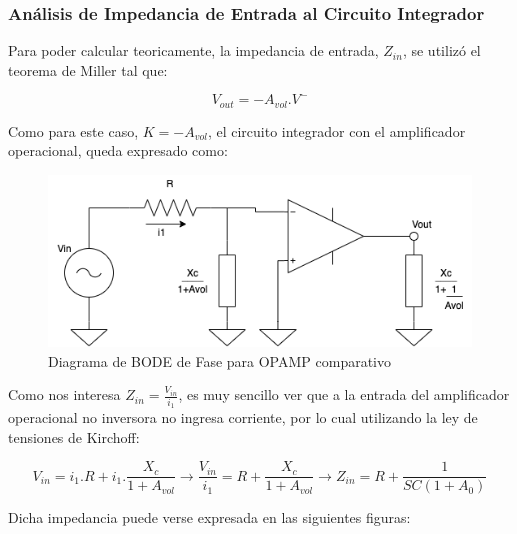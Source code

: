 \subsubsection{Análisis de Impedancia de Entrada al Circuito Integrador}

Para poder calcular teoricamente, la impedancia de entrada, $Z_{in}$, se utilizó el teorema de Miller tal que:

$$ V_{out}=-A_{vol}.V^-$$

Como para este caso, $K=-A_{vol}$, el circuito integrador con el amplificador operacional, queda expresado como:

\begin{figure}[H]
    \centering 
    \includegraphics [scale=0.7] {../Ejercicio3-CircuitoIntegradoresyDerivadores/Imagenes/miller-integrador.png} 
    \caption{Diagrama de BODE de Fase para OPAMP comparativo }
    \label{fig:emptyPlotTool}
\end{figure}

Como nos interesa $Z_{in}=\frac{V_{in}}{i_1}$, es muy sencillo ver que a la entrada del amplificador operacional no inversora no ingresa corriente,
por lo cual utilizando la ley de tensiones de Kirchoff:

$$ V_{in} = i_1.R + i_1.\frac{X_c}{1+A_{vol}} \longrightarrow \frac{V_{in}}{i_1}= R + \frac{X_c}{1+A_{vol}} \longrightarrow Z_{in}=R+\frac{1}{SC(1+A_0)}$$

Dicha impedancia puede verse expresada en las siguientes figuras:


